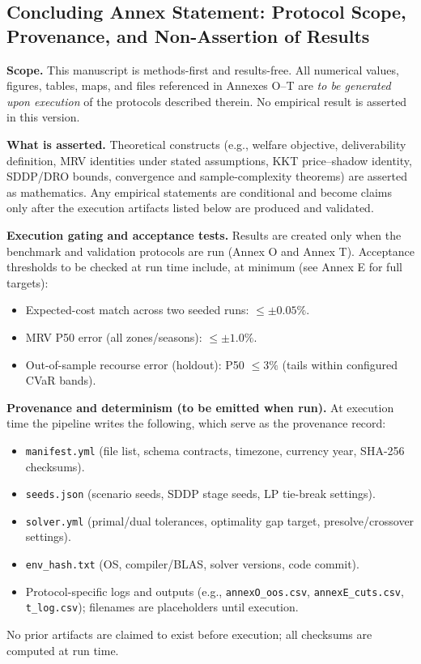 \documentclass[11pt]{article}
\numberwithin{equation}{section}
\theoremstyle{definition}
\theoremstyle{remark}
\begin{document}
\newpage

\subsection*{Concluding Annex Statement: Protocol Scope, Provenance, and Non-Assertion of Results}

\noindent\textbf{Scope.}
This manuscript is methods-first and results-free. All numerical values, figures, tables, maps, and files referenced in Annexes O–T are \emph{to be generated upon execution} of the protocols described therein. No empirical result is asserted in this version.

\medskip
\noindent\textbf{What is asserted.}
Theoretical constructs (e.g., welfare objective, deliverability definition, MRV identities under stated assumptions, KKT price–shadow identity, SDDP/DRO bounds, convergence and sample-complexity theorems) are asserted as mathematics. Any empirical statements are conditional and become claims only after the execution artifacts listed below are produced and validated.

\medskip
\noindent\textbf{Execution gating and acceptance tests.}
Results are created only when the benchmark and validation protocols are run (Annex O and Annex T). Acceptance thresholds to be checked at run time include, at minimum (see Annex E for full targets):
\begin{itemize}[leftmargin=1.2em]
  \item Expected-cost match across two seeded runs: $\le \pm 0.05\%$.
  \item MRV P50 error (all zones/seasons): $\le \pm 1.0\%$.
  \item Out-of-sample recourse error (holdout): P50 $\le 3\%$ (tails within configured CVaR bands).
\end{itemize}

\medskip
\noindent\textbf{Provenance and determinism (to be emitted when run).}
At execution time the pipeline writes the following, which serve as the provenance record:
\begin{itemize}[leftmargin=1.2em]
  \item \texttt{manifest.yml} (file list, schema contracts, timezone, currency year, SHA-256 checksums).
  \item \texttt{seeds.json} (scenario seeds, SDDP stage seeds, LP tie-break settings).
  \item \texttt{solver.yml} (primal/dual tolerances, optimality gap target, presolve/crossover settings).
  \item \texttt{env\_hash.txt} (OS, compiler/BLAS, solver versions, code commit).
  \item Protocol-specific logs and outputs (e.g., \texttt{annexO\_oos.csv}, \texttt{annexE\_cuts.csv}, \texttt{t\_log.csv}); filenames are placeholders until execution.
\end{itemize}
No prior artifacts are claimed to exist before execution; all checksums are computed at run time.
\end{document}
